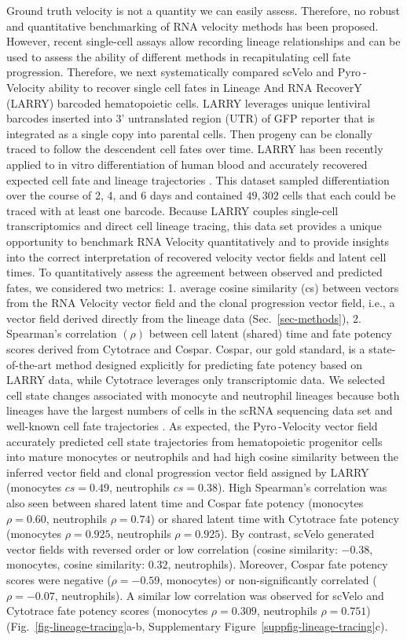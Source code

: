\documentclass[
  sn-mathphys-num,
  lineno,
  twocolumn]{sn-jnl}
\begin{document}
Ground truth velocity is not a quantity we can easily assess. Therefore,
no robust and quantitative benchmarking of RNA velocity methods has been
proposed. However, recent single-cell assays allow recording lineage
relationships and can be used to assess the ability of different methods
in recapitulating cell fate progression. Therefore, we next
systematically compared scVelo and Pyro -Velocity ability to recover
single cell fates in Lineage And RNA RecoverY (LARRY) barcoded
hematopoietic cells. LARRY leverages unique lentiviral barcodes inserted
into 3' untranslated region (UTR) of GFP reporter that is integrated as
a single copy into parental cells. Then progeny can be clonally traced
to follow the descendent cell fates over time. LARRY has been recently
applied to in vitro differentiation of human blood and accurately
recovered expected cell fate and lineage trajectories
\citep{Weinreb2020-mv}. This dataset sampled differentiation over the
course of 2, 4, and 6 days and contained \(49,302\) cells that each
could be traced with at least one barcode. Because LARRY couples
single-cell transcriptomics and direct cell lineage tracing, this data
set provides a unique opportunity to benchmark RNA Velocity
quantitatively and to provide insights into the correct interpretation
of recovered velocity vector fields and latent cell times. To
quantitatively assess the agreement between observed and predicted
fates, we considered two metrics: 1. average cosine similarity (cs)
between vectors from the RNA Velocity vector field and the clonal
progression vector field, i.e., a vector field derived directly from the
lineage data (Sec.~\ref{sec-methods}), 2. Spearman's correlation
\((\rho)\) between cell latent (shared) time and fate potency scores
derived from Cytotrace and Cospar. Cospar, our gold standard, is a
state-of-the-art method designed explicitly for predicting fate potency
based on LARRY data, while Cytotrace leverages only transcriptomic data.
We selected cell state changes associated with monocyte and neutrophil
lineages because both lineages have the largest numbers of cells in the
scRNA sequencing data set and well-known cell fate trajectories
\citep{Petukhov2018-nr}. As expected, the Pyro -Velocity vector field
accurately predicted cell state trajectories from hematopoietic
progenitor cells into mature monocytes or neutrophils and had high
cosine similarity between the inferred vector field and clonal
progression vector field assigned by LARRY (monocytes \(cs=0.49\),
neutrophils \(cs=0.38\)). High Spearman's correlation was also seen
between shared latent time and Cospar fate potency (monocytes
\(\rho=0.60\), neutrophils \(\rho=0.74\)) or shared latent time with
Cytotrace fate potency (monocytes \(\rho=0.925\), neutrophils
\(\rho=0.925\)). By contrast, scVelo generated vector fields with
reversed order or low correlation (cosine similarity: \(-0.38\),
monocytes, cosine similarity: \(0.32\), neutrophils). Moreover, Cospar
fate potency scores were negative (\(\rho=-0.59\), monocytes) or
non-significantly correlated (\(\rho=-0.07\), neutrophils). A similar
low correlation was observed for scVelo and Cytotrace fate potency
scores (monocytes \(\rho=0.309\), neutrophils \(\rho=0.751\))
(Fig.~\ref{fig-lineage-tracing}a-b,
Supplementary Figure~\ref{suppfig-lineage-tracing}c).
\end{document}
